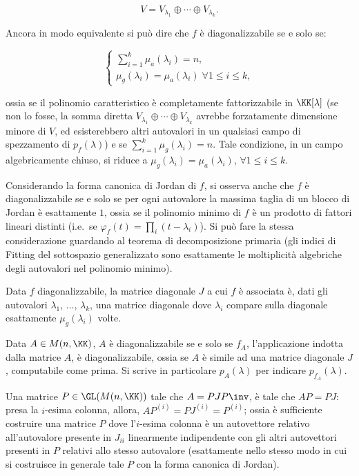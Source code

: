 \documentclass[10pt,landscape]{article}
\begin{document}
\begin{multicols}{3}
		\[ V = V_{\lambda_1} \oplus \cdots \oplus V_{\lambda_k}. \]
		
		Ancora in modo equivalente si può dire che $f$ è diagonalizzabile
		se e solo se:
		
		\[ \begin{cases} \sum_{i=1}^k \mu_a(\lambda_i) = n, \\ \mu_g(\lambda_i) = \mu_a(\lambda_i) \; \forall 1 \leq i \leq k, \end{cases} \]
		
		ossia se il polinomio caratteristico è completamente fattorizzabile
		in $\KK[\lambda]$ (se non lo fosse, la somma diretta
		$V_{\lambda_1} \oplus \cdots \oplus V_{\lambda_k}$ avrebbe
		forzatamente dimensione minore di $V$, ed esisterebbero altri
		autovalori in un qualsiasi campo di spezzamento di $p_f(\lambda)$) e se $\sum_{i=1}^k \mu_g(\lambda_i) = n$. Tale condizione, in un
		campo algebricamente chiuso, si riduce a $\mu_g(\lambda_i) = \mu_a(\lambda_i)$, $\forall 1 \leq i \leq k$.
		
		Considerando la forma canonica di Jordan di $f$, si osserva anche
		che $f$ è diagonalizzabile se e solo se per ogni autovalore la
		massima taglia di un blocco di Jordan è esattamente $1$, ossia
		se il polinomio minimo di $f$ è un prodotto di fattori lineari
		distinti (i.e.~se $\varphi_f(t) = \prod_i (t-\lambda_i)$). Si può fare la stessa considerazione guardando al
		teorema di decomposizione primaria (gli indici di Fitting del
		sottospazio generalizzato sono esattamente le moltiplicità algebriche
		degli autovalori nel polinomio minimo).
		
		Data $f$ diagonalizzabile, la matrice diagonale $J$ a cui $f$ è
		associata è, dati gli autovalori $\lambda_1$, ..., $\lambda_k$,
		una matrice diagonale dove $\lambda_i$ compare sulla diagonale
		esattamente $\mu_g(\lambda_i)$ volte.
		
		Data $A \in M(n, \KK)$, $A$ è diagonalizzabile se e solo se $f_A$,
		l'applicazione indotta dalla matrice $A$, è diagonalizzabile,
		ossia se $A$ è simile ad una matrice diagonale $J$, computabile
		come prima. Si scrive in particolare $p_A(\lambda)$ per indicare
		$p_{f_A}(\lambda)$.
		
		Una matrice $P \in \GL(M(n, \KK))$
		tale che $A = P J P\inv$, è tale che $AP = PJ$: presa la $i$-esima
		colonna, allora, $AP^{(i)} = PJ^{(i)} = P^{(i)}$; ossia è sufficiente
		costruire una matrice $P$ dove l'$i$-esima colonna è un autovettore
		relativo all'autovalore presente in $J_{ii}$ linearmente indipendente
		con gli altri autovettori presenti in $P$ relativi allo stesso
		autovalore (esattamente nello stesso modo in cui si costruisce in
		generale tale $P$ con la forma canonica di Jordan).
		

\end{multicols}
\end{document}
